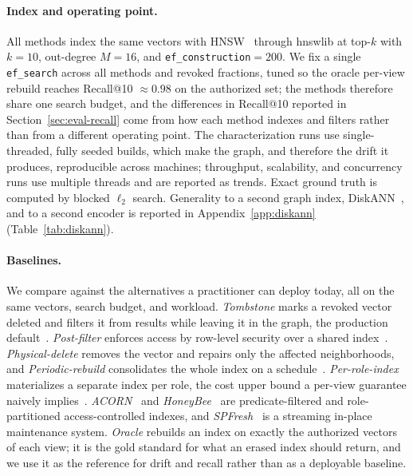 \documentclass[sigconf, nonacm, review]{acmart}
\newif\ifextended\extendedtrue %
\begin{document}
\paragraph{Index and operating point.}
\begin{sloppypar}
All methods index the same vectors with
HNSW~\cite{DBLP:journals/pami/MalkovY20} through hnswlib at top-$k$ with
$k{=}10$, out-degree $M{=}16$, and \texttt{ef\_construction}${=}200$. We
fix a single \texttt{ef\_search} across all methods and revoked fractions,
tuned so the oracle per-view rebuild reaches Recall@10 $\approx 0.98$ on the
authorized set; the methods therefore share one search budget, and the
differences in Recall@10 reported in Section~\ref{sec:eval-recall} come from
how each method indexes and filters rather than from a different operating
point. The
characterization runs use single-threaded, fully seeded builds, which make
the graph, and therefore the drift it produces, reproducible across
machines; throughput, scalability, and concurrency runs use multiple threads
and are reported as trends. Exact ground truth is computed by blocked
$\ell_2$ search. Generality to a second graph index,
DiskANN~\cite{DBLP:conf/nips/SubramanyaDSKK19}, and to a second encoder is
reported in \ifextended Appendix~\ref{app:diskann} (Table~\ref{tab:diskann})\else the extended version\fi.
\end{sloppypar}

\paragraph{Baselines.}
We compare against the alternatives a practitioner can deploy today, all
on the same vectors, search budget, and workload. \emph{Tombstone}
marks a revoked vector deleted and filters it from results while leaving it
in the graph, the production default~\cite{DBLP:journals/corr/abs-2105-09613}.
\emph{Post-filter} enforces access by row-level security over a shared
index~\cite{DBLP:conf/sigmod/RizviMSR04}. \emph{Physical-delete} removes the
vector and repairs only the affected neighborhoods, and
\emph{Periodic-rebuild} consolidates the whole index on a
schedule~\cite{DBLP:journals/corr/abs-2105-09613}. \emph{Per-role-index}
materializes a separate index per role, the cost upper bound a per-view
guarantee naively
implies~\cite{DBLP:journals/corr/abs-2505-01538,DBLP:journals/corr/abs-2401-07119}.
\emph{ACORN}~\cite{DBLP:journals/pacmmod/PatelKGZ24} and
\emph{HoneyBee}~\cite{DBLP:journals/corr/abs-2505-01538} are
predicate-filtered and role-partitioned access-controlled indexes, and
\emph{SPFresh}~\cite{DBLP:conf/sosp/XuLLXCZLYYYCY23} is a streaming in-place
maintenance system. \emph{Oracle} rebuilds an index on exactly the
authorized vectors of each view; it is the gold standard for what an erased
index should return, and we use it as the reference for drift and recall
rather than as a deployable baseline.
\end{document}
